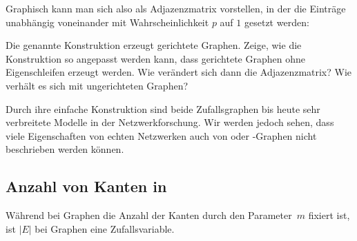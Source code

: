 \noindent
Graphisch kann man sich also \Gnp als Adjazenzmatrix vorstellen, in der die Einträge unabhängig voneinander mit Wahrscheinlichkeit $p$ auf $1$ gesetzt werden:

\begin{center}

\end{center}

\begin{exercise}
    Die genannte Konstruktion erzeugt gerichtete Graphen.
    Zeige, wie die Konstruktion so angepasst werden kann, dass gerichtete Graphen ohne Eigenschleifen erzeugt werden.
    Wie verändert sich dann die Adjazenzmatrix?
    Wie verhält es sich mit ungerichteten Graphen?
\end{exercise}

Durch ihre einfache Konstruktion sind beide Zufallsgraphen bis heute sehr verbreitete Modelle in der Netzwerkforschung.
Wir werden jedoch sehen, dass viele Eigenschaften von echten Netzwerken auch von \Gnp oder \Gnm-Graphen nicht beschrieben werden können.

\subsection{Anzahl von Kanten in \Gnp}\label{subsec:anzahl_kanten_in_gnp}
Während bei \Gnm Graphen die Anzahl der Kanten durch den Parameter~$m$ fixiert ist, ist $|E|$ bei \Gnp Graphen eine Zufallsvariable.

